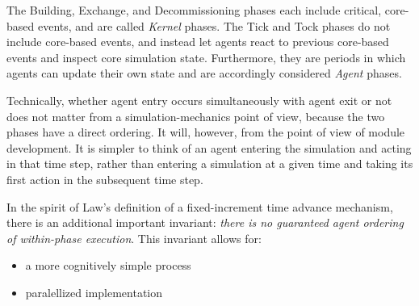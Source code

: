 The Building, Exchange, and Decommissioning phases each include critical,
core-based events, and are called \textit{Kernel} phases. The Tick and Tock
phases do not include core-based events, and instead let agents react to
previous core-based events and inspect core simulation state. Furthermore, they
are periods in which agents can update their own state and are accordingly
considered \textit{Agent} phases. 

Technically, whether agent entry occurs simultaneously with agent exit or not
does not matter from a simulation-mechanics point of view, because the two
phases have a direct ordering. It will, however, from the point of view of
module development. It is simpler to think of an agent entering the simulation
and acting in that time step, rather than entering a simulation at a given time
and taking its first action in the subsequent time step.

In the spirit of Law's definition of a fixed-increment time advance mechanism,
there is an additional important invariant: \textit{there is no guaranteed agent
  ordering of within-phase execution}. This invariant allows for:

\begin{itemize}
\item a more cognitively simple process
\item paralellized implementation
\end{itemize}

